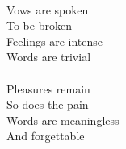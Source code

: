 \\
Vows are spoken \\
To be broken \\
Feelings are intense \\
Words are trivial \\
\\
Pleasures remain \\
So does the pain \\
Words are meaningless \\
And forgettable \\
